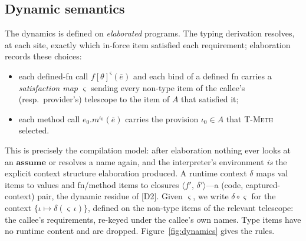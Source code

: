 \documentclass[10pt]{article}
\newcommand{\ov}[1]{\overline{#1}}
\newcommand{\kw}[1]{\mathbf{#1}}          %
\newcommand{\clo}[2]{\langle #1,\, #2\rangle}
\theoremstyle{plain}
\theoremstyle{remark}
\begin{document}
\subsection{Dynamic semantics}

The dynamics is defined on \emph{elaborated} programs. The typing
derivation resolves, at each site, exactly which in-force item satisfied
each requirement; elaboration records these choices:

\begin{itemize}
\item each defined-fn call $f[\theta]^{\varsigma}(\ov{e})$ and each bind
of a defined fn carries a \emph{satisfaction map} $\varsigma$ sending
every non-type item of the callee's (resp.\ provider's) telescope to the
item of $A$ that satisfied it;
\item each method call $e_0.m^{\iota_0}(\ov{e})$ carries the provision
$\iota_0 \in A$ that \textsc{T-Meth} selected.
\end{itemize}

\noindent
This is precisely the compilation model: after elaboration nothing ever
looks at an $\kw{assume}$ or resolves a name again, and the interpreter's
environment \emph{is} the explicit context structure elaboration
produced. A runtime context $\delta$ maps val items to values and
fn/method items to closures $\clo{f'}{\delta'}$---a (code,
captured-context) pair, the dynamic residue of [D2]. Given $\varsigma$,
we write $\delta \circ \varsigma$ for the context $\{\iota \mapsto
\delta(\varsigma\,\iota)\}$, defined on the non-type items of the
relevant telescope: the callee's requirements, re-keyed under the
callee's own names. Type items have no runtime content and are dropped.
Figure~\ref{fig:dynamics} gives the rules.
\end{document}
